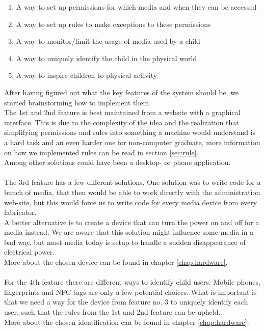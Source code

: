 \begin{enumerate}
	\item A way to set up permissions for which media and when they can be accessed
	\item A way to set up rules to make exceptions to these permissions
	\item A way to monitor/limit the usage of media used by a child
	\item A way to uniquely identify the child in the physical world
	\item A way to inspire children to physical activity
\end{enumerate}

After having figured out what the key features of the system should be, we started brainstorming how to implement them.\\
The 1st and 2nd feature is best maintained from a website with a graphical interface. This is due to the complexity of the idea and the realization that simplifying permissions and rules into something a machine would understand is a hard task and an even harder one for non-computer graduate, more information on how we implemented rules can be read in section \vref{sec:rule}.\\
Among other solutions could have been a desktop- or phone application.\\
\\
The 3rd feature has a few different solutions. One solution was to write code for a bunch of media, that then would be able to work directly with the administration web-site, but this would force us to write code for every media device from every fabricator.\\
A better alternative is to create a device that can turn the power on and off for a media instead. We are aware that this solution might influence some media in a bad way, but most media today is setup to handle a sudden disappearance of electrical power.\\
More about the chosen device can be found in chapter \vref{chap:hardware}.\\
\\
For the 4th feature there are different ways to identify child users. Mobile phones, fingerprints and NFC tags are only a few potential choices. What is important is that we need a way for the device from feature no. 3 to uniquely identify each user, such that the rules from the 1st and 2nd feature can be upheld.\\
More about the chosen identification can be found in chapter \vref{chap:hardware}.\\
